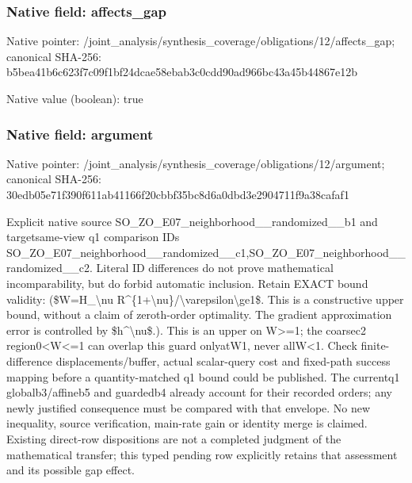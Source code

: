 \documentclass[10pt,a4paper]{article}
\begin{document}
\subsubsection{Native field: affects\_\allowbreak{}gap}
Native pointer: /joint\_\allowbreak{}analysis/synthesis\_\allowbreak{}coverage/obligations/12/affects\_\allowbreak{}gap; canonical SHA-256: b5bea41b6c623f7c09f1bf24dcae58ebab3c0cdd90ad966bc43a45b44867e12b

Native value (boolean): true

\subsubsection{Native field: argument}
Native pointer: /joint\_\allowbreak{}analysis/synthesis\_\allowbreak{}coverage/obligations/12/argument; canonical SHA-256: 30edb05e71f390f611ab41166f20cbbf35bc8d6a0dbd3e2904711f9a38cafaf1

\begingroup\raggedright\sloppy Explicit native source SO\_\allowbreak{}ZO\_\allowbreak{}E07\_\allowbreak{}neighborhood\_\allowbreak{}\_\allowbreak{}randomized\_\allowbreak{}\_\allowbreak{}b1 and targetsame-view q1 comparison IDs SO\_\allowbreak{}ZO\_\allowbreak{}E07\_\allowbreak{}neighborhood\_\allowbreak{}\_\allowbreak{}randomized\_\allowbreak{}\_\allowbreak{}c1,\allowbreak{}SO\_\allowbreak{}ZO\_\allowbreak{}E07\_\allowbreak{}neighborhood\_\allowbreak{}\_\allowbreak{}randomized\_\allowbreak{}\_\allowbreak{}c2. Literal ID differences do not prove mathematical incomparability,\allowbreak{} but do forbid automatic inclusion. Retain EXACT bound validity:\allowbreak{} (\$W=\allowbreak{}H\_\allowbreak{}\textbackslash{}nu R\textasciicircum{}\{1+\textbackslash{}nu\}/\allowbreak{}\textbackslash{}varepsilon\textbackslash{}ge1\$. This is a constructive upper bound,\allowbreak{} without a claim of zeroth-order optimality. The gradient approximation error is controlled by \$h\textasciicircum{}\textbackslash{}nu\$.). This is an upper on W>=\allowbreak{}1;\allowbreak{} the coarsec2 region0<W<=\allowbreak{}1 can overlap this guard onlyatW1,\allowbreak{} never allW<1. Check finite-difference displacements/\allowbreak{}buffer,\allowbreak{} actual scalar-query cost and fixed-path success mapping before a quantity-matched q1 bound could be published. The currentq1 globalb3/\allowbreak{}affineb5 and guardedb4 already account for their recorded orders;\allowbreak{} any newly justified consequence must be compared with that envelope. No new inequality,\allowbreak{} source verification,\allowbreak{} main-rate gain or identity merge is claimed. Existing direct-row dispositions are not a completed judgment of the mathematical transfer;\allowbreak{} this typed pending row explicitly retains that assessment and its possible gap effect.\par\endgroup
\end{document}
